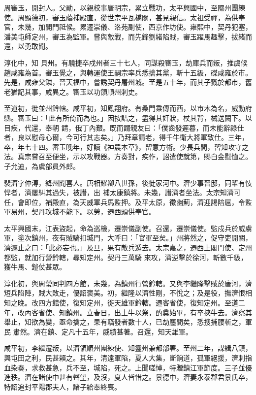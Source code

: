 \begin{pinyinscope}
 周審玉，開封人。父勛，以親校事唐明宗，累立戰功，太平興國中，至隰州團練使。周顯德初，審玉蔭補殿直，從世宗平瓦橋關，甚見親信。太祖受禪，為供奉官，未幾，加閣門祗候。累遷崇儀、洛苑副使，西京作坊使。雍熙中，契丹犯塞，潘美屯師定州，審玉為監軍。嘗與敵戰，而先鋒劉緒陷賊，審玉躍馬趣擊，拔緒而還，以勇敢聞。



 淳化中，知
 貝州。有驍捷卒戍州者三十七人，同謀殺審玉，劫庫兵而叛，推虞候趙咸雍為首。審玉覺之，與轉運使王嗣宗率兵悉擒其黨，斬十五級，磔咸雍於市。先是，咸雍父鏻，晉天福中，嘗誘契丹屠州城。至是五十年，而其子戮於都市，舊老猶記其事，咸異之。審玉以功領順州刺史。



 至道初，徙並州鈐轄。咸平初，知鳳翔府。有桑門乘傳而西，以市木為名，威動府縣。審玉曰：「此有所倚而為也。」因按詰之，盡得其奸狀，杖其背，械送闕下。以目疾，代還，奉朝
 請，俄丁內艱。既而謂親友曰：「僕齒發遲暮，而未能辭祿仕者，良以慰母心爾，今可行其志矣。」乃拜章請老，得千牛衛大將軍致仕。三年，卒，年七十四。審玉晚年，好讀《神農本草》，留意方術。少長兵間，習知攻守之法。真宗嘗召至便坐，示以攻戰器。方奏對，疾作，詔遣使就第，賜白金慰恤之。子允迪，為虞部員外郎。



 裴濟字仲溥，絳州聞喜人。唐相耀卿八世孫，後徙家河中。濟少事晉邸，同輩有忮悍者，濟屢糾其過失，被譖，出
 補太康鎮將。未幾，譖濟者坐法。太宗知濟可任，會即位，補殿直，為天威軍兵馬監押。及平太原，徵幽薊，濟迎謁陪扈，令監軍易州，契丹攻城不能下。以勞，遷西頭供奉官。



 太平興國末，江表盜起，命為巡檢，遷崇儀副使。召還，遷崇儀使。監戍兵於威虜軍，塗次鎮州，夜有賊騎扣城門，大呼曰：「官軍至矣。」州將然之，促守吏開關，濟遽止之曰：「此必妄也。」及旦，果有敵兵遁去。太宗嘉之，遷西上閣門使、定州都監，就加行營鈐轄，尋知定州。契丹三萬騎
 來攻，濟逆擊於徐河，斬數千級，獲牛馬、鎧仗甚眾。



 淳化初，與周瑩同判四方館，未幾，為鎮州行營鈐轄。又與李繼隆擊賊於唐河，濟短兵陷陣，賊大敗走，優詔褒美。初，繼隆以濟性剛，不悅之；及是役，撫濟恨相知之晚。改四方館使，復知定州，徙天雄軍鈐轄。遷客省使，復知定州。至道二年，改內客省使、知鎮州。立春日，出土牛以祭，酌奠始畢，有卒挾牛去。濟察其舉止，知欲為變，亟命擒之，果有竊發者數十人，已劫廛間矣，悉搜捕腰斬之，軍民
 肅然。濟在鎮、定凡十五年，威績甚著。召還，知天雄軍。



 咸平初，李繼遷叛，以濟領順州團練使、知靈州兼都部署。至州二年，謀緝八鎮，興屯田之利，民甚賴之。其年，清遠軍陷，夏人大集，斷餉道，孤軍絕援，濟刺指血染奏，求救甚急，兵不至，城陷，死之。上聞嗟悼，特贈鎮江軍節度。三子並優進秩。濟在諸使中甚有聲望，及沒，夏人皆惜之。景德中，濟妻永泰郡君景氏卒，特詔追封平陽郡夫人，諸子給奉終喪。




\end{pinyinscope}
